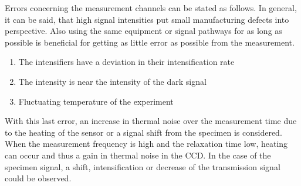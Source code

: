 Errors concerning the measurement channels can be stated as follows. In general, it can be said, that high signal intensities put small manufacturing defects into perspective. Also using the same equipment or signal pathways for as long as possible is beneficial for getting as little error as possible from the measurement.
\begin{enumerate}
    \item The intensifiers have a deviation in their intensification rate
    \item The intensity is near the intensity of the dark signal
    \item Fluctuating temperature of the experiment
\end{enumerate}
    With this last error, an increase in thermal noise over the measurement time due to the heating of the sensor or a signal shift from the specimen is considered. When the measurement frequency is high and the relaxation time low, heating can occur and thus a gain in thermal noise in the CCD. In the case of the specimen signal, a shift, intensification or decrease of the transmission signal could be observed.